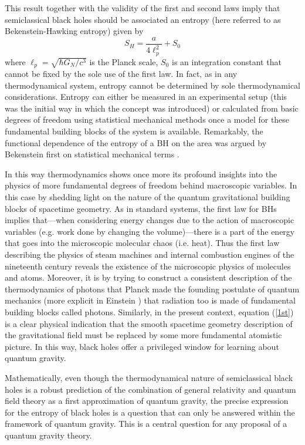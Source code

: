 \documentclass[aps, nofootinbib,superscriptaddress,12pt]{revtex4-2}
\def\be{\begin{equation}}
\def\ee{\end{equation}}
\begin{document}
This result together with the validity of the first and second laws imply that semiclassical black holes should be associated an 
entropy (here referred to as Bekenstein-Hawking entropy) given by 
\be
S_{H}=\frac{a}{4\ell_p^2}+S_0
\ee
where $\ell_p=\sqrt{\hbar G_N/c^3}$ is the Planck scale,   $S_0$ is an integration constant that cannot be fixed by the sole use of the first law. 
In fact, as in any thermodynamical system, entropy cannot be determined by sole thermodynamical considerations. 
Entropy can either be measured in an experimental setup (this was the initial way in which the concept was introduced) or calculated from basic degrees of freedom using statistical mechanical methods once a model for these fundamental building 
blocks of the system is available. Remarkably, the functional dependence of the entropy of a BH on the area was argued 
by Bekenstein first on statistical mechanical terms \cite{Bekenstein:1973ur}. 

In this way thermodynamics shows once more its profound insights into the physics of  
more fundamental degrees of freedom behind macroscopic variables. In this case by shedding light on the nature of the quantum gravitational building blocks of spacetime geometry. As in standard systems, the first law for BHs implies that---when considering energy changes due to the action of macroscopic variables
(e.g. work done by changing the volume)---there is a part of the energy that goes into the microscopic
molecular chaos (i.e. heat). Thus the first law describing the physics of steam machines and internal combustion engines of the nineteenth century
reveals the existence of the microscopic physics of molecules and atoms. Moreover, it is by trying to construct a consistent description of the 
thermodynamics of photons that Planck made the founding postulate of quantum mechanics \cite{Planck:1901tja} (more explicit in Einstein \cite{Einstein:1905cc}) that radiation too
is made of fundamental building blocks called photons. {Similarly, in the present context, equation (\ref{1st}) is a clear physical indication that the smooth spacetime geometry    
description of the gravitational field must be replaced by some more fundamental atomistic picture. }
In this way, black holes offer a privileged window for learning about quantum gravity. 


Mathematically, even though the thermodynamical nature of semiclassical black holes is a
robust prediction of the combination of general relativity and quantum field theory as a first approximation of quantum gravity, 
the precise expression for the entropy of black holes is a question that can only be answered within the
framework of quantum gravity. This is a central question for any 
proposal of a quantum gravity theory. 
\end{document}
